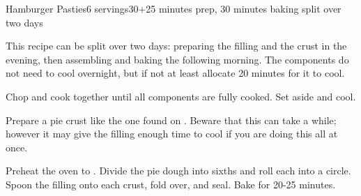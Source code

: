 \documentclass[../Cookbook.tex]{subfiles}
\begin{document}
\begin{recipe}{Hamburger Pasties}{6 servings}{30+25 minutes prep, 30 minutes baking split over two days}

This recipe can be split over two days: preparing the filling and the crust in the evening, then assembling and baking the following morning. The components do not need to cool overnight, but if not at least allocate 20 minutes for it to cool.

Chop and cook together until all components are fully cooked. Set aside and cool.

\newstep
Prepare a pie crust like the one found on . Beware that this can take a while; however it may give the filling enough time to cool if you are doing this all at once.

\newstep
Preheat the oven to .
Divide the pie dough into sixths and roll each into a circle. Spoon the filling onto each crust, fold over, and seal. Bake for 20-25 minutes.

\end{recipe}
\end{document}
